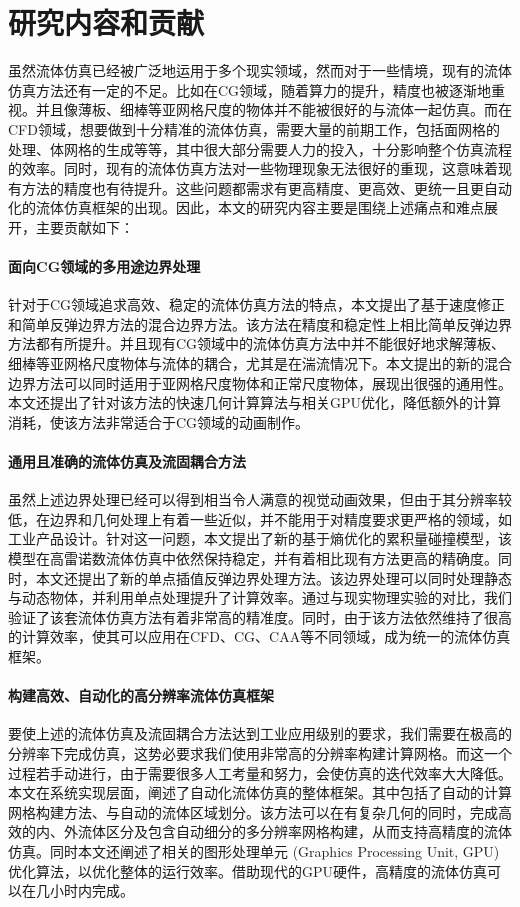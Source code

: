 \section{研究内容和贡献}
虽然流体仿真已经被广泛地运用于多个现实领域，然而对于一些情境，现有的流体仿真方法还有一定的不足。比如在CG领域，随着算力的提升，精度也被逐渐地重视。并且像薄板、细棒等亚网格尺度的物体并不能被很好的与流体一起仿真。而在CFD领域，想要做到十分精准的流体仿真，需要大量的前期工作，包括面网格的处理、体网格的生成等等，其中很大部分需要人力的投入，十分影响整个仿真流程的效率。同时，现有的流体仿真方法对一些物理现象无法很好的重现，这意味着现有方法的精度也有待提升。这些问题都需求有更高精度、更高效、更统一且更自动化的流体仿真框架的出现。因此，本文的研究内容主要是围绕上述痛点和难点展开，主要贡献如下：

\paragraph{面向CG领域的多用途边界处理}
针对于CG领域追求高效、稳定的流体仿真方法的特点，本文提出了基于速度修正和简单反弹边界方法的混合边界方法。该方法在精度和稳定性上相比简单反弹边界方法都有所提升。并且现有CG领域中的流体仿真方法中并不能很好地求解薄板、细棒等亚网格尺度物体与流体的耦合，尤其是在湍流情况下。本文提出的新的混合边界方法可以同时适用于亚网格尺度物体和正常尺度物体，展现出很强的通用性。本文还提出了针对该方法的快速几何计算算法与相关GPU优化，降低额外的计算消耗，使该方法非常适合于CG领域的动画制作。

\paragraph{通用且准确的流体仿真及流固耦合方法}
虽然上述边界处理已经可以得到相当令人满意的视觉动画效果，但由于其分辨率较低，在边界和几何处理上有着一些近似，并不能用于对精度要求更严格的领域，如工业产品设计。针对这一问题，本文提出了新的基于熵优化的累积量碰撞模型，该模型在高雷诺数流体仿真中依然保持稳定，并有着相比现有方法更高的精确度。同时，本文还提出了新的单点插值反弹边界处理方法。该边界处理可以同时处理静态与动态物体，并利用单点处理提升了计算效率。通过与现实物理实验的对比，我们验证了该套流体仿真方法有着非常高的精准度。同时，由于该方法依然维持了很高的计算效率，使其可以应用在CFD、CG、CAA等不同领域，成为统一的流体仿真框架。

\paragraph{构建高效、自动化的高分辨率流体仿真框架}
要使上述的流体仿真及流固耦合方法达到工业应用级别的要求，我们需要在极高的分辨率下完成仿真，这势必要求我们使用非常高的分辨率构建计算网格。而这一个过程若手动进行，由于需要很多人工考量和努力，会使仿真的迭代效率大大降低。本文在系统实现层面，阐述了自动化流体仿真的整体框架。其中包括了自动的计算网格构建方法、与自动的流体区域划分。该方法可以在有复杂几何的同时，完成高效的内、外流体区分及包含自动细分的多分辨率网格构建，从而支持高精度的流体仿真。同时本文还阐述了相关的图形处理单元 (Graphics Processing Unit, GPU) 优化算法，以优化整体的运行效率。借助现代的GPU硬件，高精度的流体仿真可以在几小时内完成。


